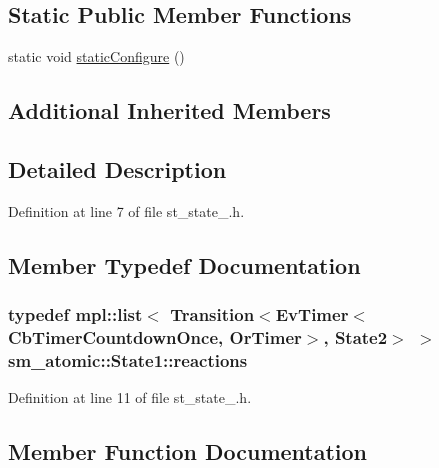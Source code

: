 \subsection*{Static Public Member Functions}
\begin{DoxyCompactItemize}
\item 
static void \hyperlink{structsm__atomic_1_1State1_a299adfad0ff1e2c592c319e1fa5de114}{static\+Configure} ()
\end{DoxyCompactItemize}
\subsection*{Additional Inherited Members}


\subsection{Detailed Description}


Definition at line 7 of file st\+\_\+state\+\_.\+h.



\subsection{Member Typedef Documentation}
\subsubsection[{\texorpdfstring{reactions}{reactions}}]{\setlength{\rightskip}{0pt plus 5cm}typedef mpl\+::list$<$ Transition$<${\bf Ev\+Timer}$<${\bf Cb\+Timer\+Countdown\+Once}, {\bf Or\+Timer}$>$, {\bf State2}$>$ $>$ {\bf sm\+\_\+atomic\+::\+State1\+::reactions}}\hypertarget{structsm__atomic_1_1State1_a38f44b3dfc4a7d81d4d2b7aca81171af}{}\label{structsm__atomic_1_1State1_a38f44b3dfc4a7d81d4d2b7aca81171af}


Definition at line 11 of file st\+\_\+state\+\_.\+h.



\subsection{Member Function Documentation}
